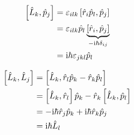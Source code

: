 \documentclass[11pt, ngerman, fleqn, DIV=15, headinclude]{scrartcl}
\begin{document}
\begin{align*}
	\left[ \hat  L_k, \hat p_j \right]
	&= \varepsilon_{ilk} \left[ \hat r_i \hat p_l, \hat p_j \right]\\
	&= \varepsilon_{ilk} \hat p_l \underbrace{\left[ \hat r_i,
	\hat p_j \right]}_{-\mathrm i\hbar\delta_{ij}}\\
	&= \mathrm i\hbar\varepsilon_{jkl}\hat  p_l
\end{align*}

\begin{align*}
	\left[ \hat L_k, \hat L_j \right]
	&= \left[ \hat L_k,\hat r_l \hat p_k - \hat r_k \hat p_l \right]\\
	&= \left[ \hat L_k, \hat r_l \right] \hat p_k - \hat r_k \left[ \hat L_k, \hat p_l \right]\\
	&= - \mathrm i \hbar \hat r_j \hat p_k + \mathrm i \hbar \hat r_k \hat p_j\\
	&= \mathrm i \hbar \hat L_l
\end{align*}
		
\end{document}

